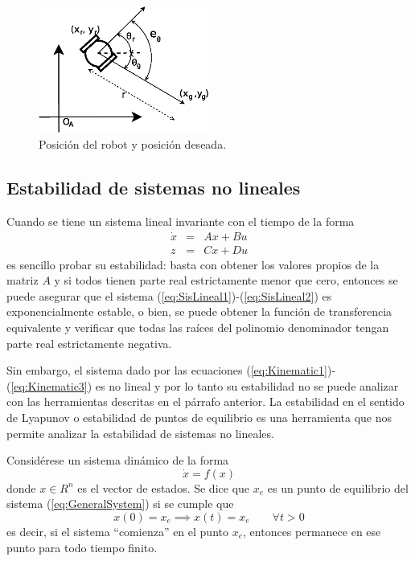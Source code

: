 \documentclass[a4paper]{article}
\begin{document}
\begin{figure}
\centering
\includegraphics[width=0.5\textwidth]{Figures/GoalPose.eps}
\caption{Posición del robot y posición deseada.}
\label{fig:Coords}
\end{figure}


\subsection{Estabilidad de sistemas no lineales}
Cuando se tiene un sistema lineal invariante con el tiempo de la forma
\begin{eqnarray}
  \dot{x} &=& Ax + Bu\label{eq:SisLineal1}\\
  z &=& Cx + Du\label{eq:SisLineal2}
\end{eqnarray}
es sencillo probar su estabilidad: basta con obtener los valores propios de la matriz $A$ y si todos tienen parte real estrictamente menor que cero, entonces se puede asegurar que el sistema (\ref{eq:SisLineal1})-(\ref{eq:SisLineal2}) es exponencialmente estable, o bien, se puede obtener la función de transferencia equivalente y verificar que todas las raíces del polinomio denominador tengan parte real estrictamente negativa.

Sin embargo, el sistema dado por las ecuaciones (\ref{eq:Kinematic1})-(\ref{eq:Kinematic3}) es no lineal y por lo tanto su estabilidad no se puede analizar con las herramientas descritas en el párrafo anterior. La estabilidad en el sentido de Lyapunov o estabilidad de puntos de equilibrio es una herramienta que nos permite analizar la estabilidad de sistemas no lineales. 

Considérese un sistema dinámico de la forma 
\begin{equation}
\dot{x} = f(x) \label{eq:GeneralSystem}
\end{equation}
donde $x\in R^n$ es el vector de estados. Se dice que $x_e$ es un punto de equilibrio del sistema (\ref{eq:GeneralSystem}) si se cumple que
\begin{equation}
  \label{eq:Equilibrium}
  x(0) = x_e \implies x(t) = x_e \qquad\forall t > 0
\end{equation}
es decir, si el sistema ``comienza'' en el punto $x_e$, entonces permanece en ese punto para todo tiempo finito.
\end{document}

